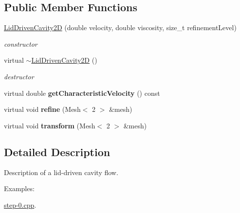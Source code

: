 \subsection*{Public Member Functions}
\begin{DoxyCompactItemize}
\item 
\hyperlink{classnatrium_1_1LidDrivenCavity2D_a139fe700f3e871e1b51eada1a41c69b1}{LidDrivenCavity2D} (double velocity, double viscosity, size\_\-t refinementLevel)
\begin{DoxyCompactList}\small\item\em constructor \item\end{DoxyCompactList}\item 
\hypertarget{classnatrium_1_1LidDrivenCavity2D_a8ae5029b008eb3d3c810bae81440b29c}{
virtual \hyperlink{classnatrium_1_1LidDrivenCavity2D_a8ae5029b008eb3d3c810bae81440b29c}{$\sim$LidDrivenCavity2D} ()}
\label{classnatrium_1_1LidDrivenCavity2D_a8ae5029b008eb3d3c810bae81440b29c}

\begin{DoxyCompactList}\small\item\em destructor \item\end{DoxyCompactList}\item 
\hypertarget{classnatrium_1_1LidDrivenCavity2D_a82c2d453cd5dd83f09a438201a7adec6}{
virtual double {\bfseries getCharacteristicVelocity} () const }
\label{classnatrium_1_1LidDrivenCavity2D_a82c2d453cd5dd83f09a438201a7adec6}

\item 
\hypertarget{classnatrium_1_1LidDrivenCavity2D_a1899d1f52f6f0e25f6be7dff5746efb9}{
virtual void {\bfseries refine} (Mesh$<$ 2 $>$ \&mesh)}
\label{classnatrium_1_1LidDrivenCavity2D_a1899d1f52f6f0e25f6be7dff5746efb9}

\item 
\hypertarget{classnatrium_1_1LidDrivenCavity2D_af42aefb1a7b763f7b0cca834038b5290}{
virtual void {\bfseries transform} (Mesh$<$ 2 $>$ \&mesh)}
\label{classnatrium_1_1LidDrivenCavity2D_af42aefb1a7b763f7b0cca834038b5290}

\end{DoxyCompactItemize}


\subsection{Detailed Description}
Description of a lid-\/driven cavity flow. \begin{Desc}
\item[Examples: ]\par


\hyperlink{step-0_8cpp-example}{step-\/0.cpp}.\end{Desc}


